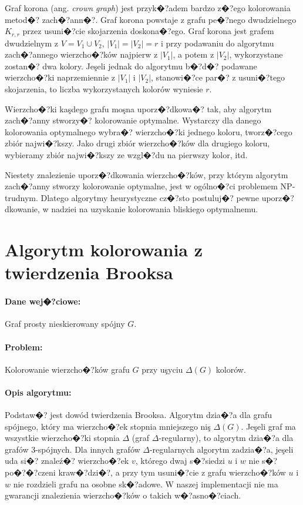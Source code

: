 \documentclass[12pt,a4paper]{mwrep}
\begin{document}
Graf korona (ang. \emph{crown graph}) \cite{wiki_crown_graph}
jest przyk�?adem bardzo z�?ego kolorowania metod�? zach�?ann�?.
Graf korona powstaje z grafu pe�?nego dwudzielnego $K_{r,r}$
przez usuni�?cie skojarzenia doskona�?ego.
Graf korona jest grafem dwudzielnym z $V=V_1 \cup V_2$,
$|V_1|=|V_2|=r$ i przy podawaniu do algorytmu zach�?annego wierzcho�?ków 
najpierw z $|V_1|$, a potem z $|V_2|$, wykorzystane zostan�? dwa
kolory. Jeşeli jednak do algorytmu b�?d�? podawane wierzcho�?ki
naprzemiennie z $|V_1|$ i $|V_2|$, stanowi�?ce par�? z usuni�?tego
skojarzenia, to liczba wykorzystanych kolorów wyniesie $r$.

%
Wierzcho�?ki kaşdego grafu moşna uporz�?dkowa�? tak, aby algorytm
zach�?anny stworzy�? kolorowanie optymalne.
Wystarczy dla danego kolorowania optymalnego wybra�? wierzcho�?ki
jednego koloru, tworz�?cego zbiór najwi�?kszy. Jako drugi zbiór wierzcho�?ków
dla drugiego koloru, wybieramy zbiór najwi�?kszy ze wzgl�?du
na pierwszy kolor, itd.

Niestety znalezienie uporz�?dkowania wierzcho�?ków, przy którym
algorytm zach�?anny stworzy kolorowanie optymalne,
jest w ogólno�?ci problemem NP-trudnym.
Dlatego algorytmy heurystyczne cz�?sto postuluj�? pewne uporz�?dkowanie,
w nadziei na uzyskanie kolorowania bliskiego optymalnemu.


\section{Algorytm kolorowania z twierdzenia Brooksa}
\label{sec:Brooks_algorithm}

\paragraph{Dane wej�?ciowe:} Graf prosty nieskierowany spójny $G$.

\paragraph{Problem:} Kolorowanie wierzcho�?ków grafu $G$ przy uşyciu
$\Delta(G)$ kolorów.

\paragraph{Opis algorytmu:} Podstaw�? jest dowód twierdzenia Brooksa. 
Algorytm dzia�?a dla grafu spójnego, który ma wierzcho�?ek
stopnia mniejszego niş $\Delta(G)$.
Jeşeli graf ma wszystkie wierzcho�?ki stopnia $\Delta$
(graf $\Delta$-regularny), to algorytm dzia�?a dla grafów
3-spójnych.
Dla innych grafów $\Delta$-regularnych algorytm zadzia�?a,
jeşeli uda si�? znaleź�? wierzcho�?ek $v$, którego dwaj s�?siedzi
$u$ i $w$ nie s�? po�?�?czeni kraw�?dzi�?, a przy tym usuni�?cie
z grafu wierzcho�?ków $u$ i $w$ nie rozdzieli grafu na osobne
sk�?adowe. W naszej implementacji nie ma gwarancji znalezienia
wierzcho�?ków o takich w�?asno�?ciach.
\end{document}
